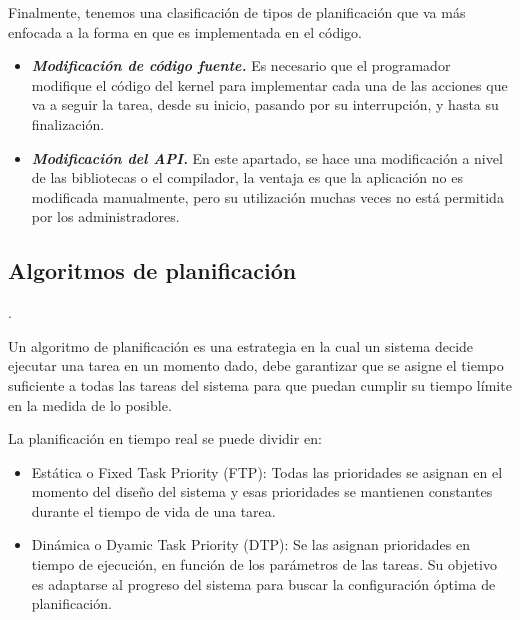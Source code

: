      \vspace{0.3cm}
     
Finalmente, tenemos una clasificación de tipos de planificación que va más enfocada a la forma en que es implementada en el código.

\begin{itemize}

\item \textbf{\textit{Modificación de código fuente.}}
	Es necesario que el programador modifique el código del kernel para implementar cada una de las acciones que va a seguir la tarea, desde su inicio, pasando por su interrupción, y hasta su finalización.
	
\item \textbf{\textit{Modificación del API.}}
	En este apartado, se hace una modificación a nivel de las bibliotecas o el compilador, la ventaja es que la aplicación no es modificada manualmente, pero su utilización muchas veces no está permitida por los administradores.
	
\end{itemize}

    \subsection{Algoritmos de planificación}\label{sec:AlgoPlan}. 
    
    Un algoritmo de planificación es una estrategia en la cual un sistema decide ejecutar una tarea en un momento dado, debe garantizar que se asigne el tiempo suficiente a todas las tareas del sistema para que puedan cumplir su tiempo límite en la medida de lo posible.
    
    La planificación en tiempo real se puede dividir en:
    \begin{itemize}
    \item Estática o Fixed Task Priority (FTP):  Todas las prioridades se asignan en el momento del diseño del sistema y esas prioridades se mantienen constantes durante el tiempo de vida de una tarea.
    \item Dinámica o Dyamic Task Priority (DTP): Se las asignan prioridades en tiempo de ejecución, en función de los parámetros de las tareas. Su objetivo es adaptarse al progreso del sistema para buscar la configuración óptima de planificación.
    \end{itemize}   
    
